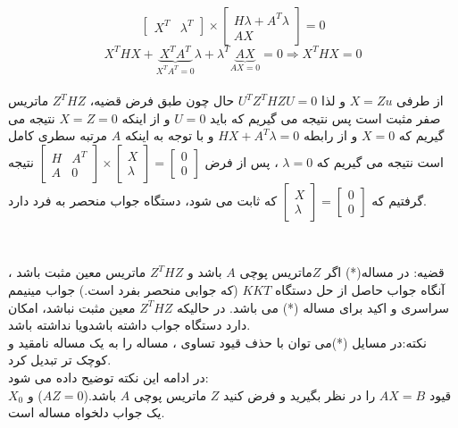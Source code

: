 \documentclass{article}
\begin{document}
\[\begin{bmatrix*}
X^T & \lambda^T
\end{bmatrix*}
\times
\begin{bmatrix*}
H\lambda+A^T\lambda\\
AX
\end{bmatrix*}
 = 0\]
\[X^THX+\underbrace{X^TA^T}_\text{$X^TA^T=0$}\lambda+\lambda^T\underbrace{AX}_\text{$AX=0$}=0   \Rightarrow   X^THX=0\]\\
از طرفی
$X=Zu$
و لذا
$U^TZ^THZU=0$ 
حال چون طبق فرض قضیه، 
$ Z^THZ $ 
ماتریس صفر مثبت است پس نتیجه می گیریم که باید 
$U=0$
و از اینکه 
$X=Z=0 $ 
نتیجه می گیریم که    
$X=0$ 
و از رابطه 
$HX+A^T\lambda=0$ 
و با توجه به اینکه $A$
مرتبه سطری کامل است نتیجه می گیریم که $\lambda=0 $
، پس از فرض
$\begin{bmatrix*}
 H & A^T \\
 A & 0
\end{bmatrix*}
\times
\begin{bmatrix*}
X\\
\lambda
\end{bmatrix*}
 = \begin{bmatrix*}
0\\
0
\end{bmatrix*}$
نتیجه گرفتیم که
$\begin{bmatrix*}
 X\\
 \lambda
\end{bmatrix*}=
\begin{bmatrix*}
0\\
0
\end{bmatrix*}$
که ثابت می شود، دستگاه جواب منحصر به فرد دارد.\\
\begin{flushleft}
\raggedright{\RectangleBold\quad}\\
\end{flushleft}
\baselineskip=0.7cm
قضیه: در مساله(*) اگر 
$Z$ماتریس پوچی $A$
باشد و $Z^THZ$
ماتریس معین مثبت باشد ، آنگاه جواب حاصل از حل دستگاه 
$KKT$ (که جوابی منحصر بفرد است.)
جواب مینیمم سراسری و اکید برای مساله (*)
می باشد. در حالیکه $Z^THZ$
معین مثبت نباشد، امکان دارد دستگاه جواب داشته باشدویا نداشته باشد.\\
نکته:در مسایل (*)می توان با حذف قیود تساوی ، مساله را به یک مساله نامقید و کوچک تر تبدیل کرد.\\
در ادامه این نکته توضیح داده می شود:\\
قیود $AX=B$
را در نظر بگیرید و فرض کنید $Z $
ماتریس پوچی $A$
باشد.($AZ=0$) و  
$X_0$
یک جواب دلخواه مساله است.
\end{document}
